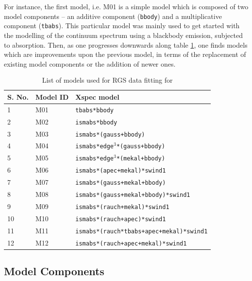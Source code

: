 		For instance, the first model, i.e. M01 is a simple model which is composed of two model components -- an additive component (\texttt{bbody}) and a multiplicative component (\texttt{tbabs}). This particular model was mainly used to get started with the modelling of the continuum spectrum using a blackbody emission, subjected to absorption. Then, as one progresses downwards along table \ref{xmm-rgs-model-list}, one finds models which are improvements upon the previous model, in terms of the replacement of existing model components or the addition of newer ones.
		\begin{table}[h!]
			\centering
			\caption{List of models used for RGS data fitting for \source}
			\label{xmm-rgs-model-list}
			\begin{tabular}{lll}
				\hline
				\textbf{S. No.} & \textbf{Model ID} & \textbf{Xspec model} \\ \hline
				{1} & {M01} & \texttt{tbabs*bbody} \\ %
				{2} & {M02} & \texttt{ismabs*bbody} \\ %
				{3} & {M03} & \texttt{ismabs*(gauss+bbody)} \\ %
				{4} & {M04} & \texttt{ismabs*edge$^3$*(gauss+bbody)} \\ %
				{5} & {M05} & \texttt{ismabs*edge$^3$*(mekal+bbody)} \\ %
				{6} & {M06} & \texttt{ismabs*(apec+mekal)*swind1} \\ %
				{7} & {M07} & \texttt{ismabs*(gauss+mekal+bbody)} \\ %
				{8} & {M08} & \texttt{ismabs*(gauss+mekal+bbody)*swind1} \\ %
				{9} & {M09} & \texttt{ismabs*(rauch+mekal)*swind1} \\ %
				{10} & {M10} & \texttt{ismabs*(rauch+apec)*swind1} \\ %
				{11} & {M11} & \texttt{ismabs*(rauch*tbabs+apec+mekal)*swind1} \\ %
				{12} & {M12} & \texttt{ismabs*(rauch+apec+mekal)*swind1} \\ \hline
			\end{tabular}
		\end{table}
	
		\subsection{Model Components} \label{hi-resolution:models:components}
		
